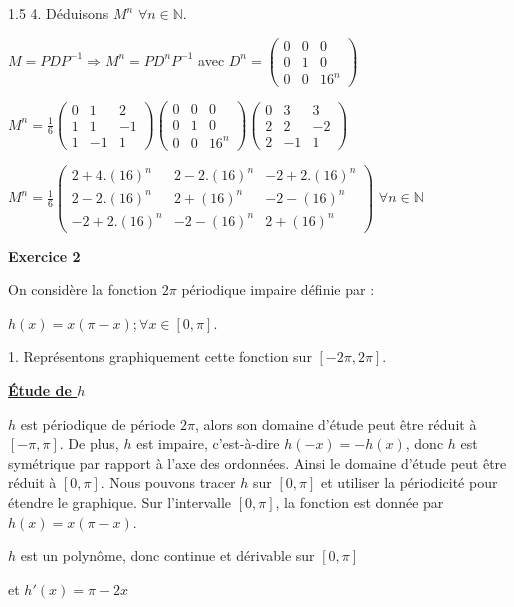 \documentclass[12pt]{article}
\begin{document}
\begin{spacing}{1.5}
4. Déduisons $M^{n}$ $\forall n\in \mathbb{N}$.

$M=PDP^{-1}\Rightarrow M^n=PD^nP^{-1}$ avec $D^n=\begin{pmatrix}
0 & 0 & 0 \\ 
0 & 1 & 0 \\ 
0 & 0 & 16^n
\end{pmatrix}$

$M^n=\frac{1}{6}\begin{pmatrix}
0 & 1  & 2 \\ 
1 & 1  & -1\\ 
1 & -1 & 1 
\end{pmatrix}\begin{pmatrix}
0 & 0 & 0 \\ 
0 & 1 & 0 \\ 
0 & 0 & 16^n
\end{pmatrix}\begin{pmatrix}
0 & 3  & 3 \\ 
2 & 2  & -2\\ 
2 & -1 & 1 
\end{pmatrix}$

$M^n=\frac{1}{6}\begin{pmatrix}
2+4.(16)^n & 2-2.(16)^n  & -2+2.(16)^n \\ 
2-2.(16)^n & 2+(16)^n  & -2-(16)^n\\ 
-2+2.(16)^n & -2-(16)^n & 2+(16)^n 
\end{pmatrix}$ $\forall n\in \mathbb{N}$

\medskip
\medskip
\textbf{Exercice 2}

On considère la fonction $2\pi$ périodique impaire définie par : 

$h(x)=x(\pi-x); \forall {x}\in [0,\pi]$.

1. Représentons graphiquement cette fonction sur $[-2\pi,2\pi]$.

\underline{\textbf{ Étude de $h$}}

$h$ est périodique de période $2\pi$, alors son domaine d'étude peut être réduit à $[-\pi,\pi]$. De plus, $h$ est impaire, c'est-à-dire $h(-x)=-h(x)$, donc $h$ est symétrique par rapport à l'axe des ordonnées. Ainsi le domaine d'étude peut être réduit à $[0,\pi]$. Nous pouvons tracer $h$ sur $[0,\pi]$ et utiliser la périodicité pour étendre le graphique. Sur l'intervalle $[0, \pi]$, la fonction est donnée par $h(x) = x(\pi - x)$.

$h$ est un polynôme, donc continue et dérivable sur $[0,\pi]$

et $h'(x)=\pi-2x$


\end{spacing}
\end{document}
